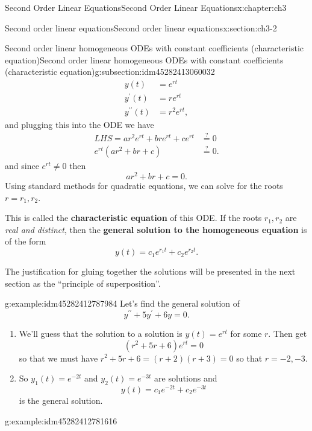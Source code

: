\documentclass[oneside,10pt,]{book}
\newcommand{\terminology}[1]{\textbf{#1}}
\numberwithin{equation}{section}
\numberwithin{equation}{section}
\newcommand{\amp}{&}
\begin{document}
\begin{chapterptx}{Second Order Linear Equations}{}{Second Order Linear Equations}{}{}{x:chapter:ch3}
\begin{sectionptx}{Second order linear equations}{}{Second order linear equations}{}{}{x:section:ch3-2}
\begin{subsectionptx}{Second order linear homogeneous ODEs with constant coefficients (characteristic equation)}{}{Second order linear homogeneous ODEs with constant coefficients (characteristic equation)}{}{}{g:subsection:idm45282413060032}
\begin{align*}
y(t) \amp =e^{rt}\\
y^{\prime}(t) \amp =re^{rt}\\
y^{\prime\prime}(t) \amp =r^{2}e^{rt},
\end{align*}
and plugging this into the ODE we have%
\begin{align*}
LHS=ar^{2}e^{rt}+bre^{rt}+ce^{rt} \amp \overset{?}{=}0\\
e^{rt}\left(ar^{2}+br+c\right) \amp \overset{?}{=}0.
\end{align*}
and since \(e^{rt}\neq0\) then%
\begin{equation*}
ar^{2}+br+c=0.
\end{equation*}
Using standard methods for quadratic equations, we can solve for the roots \(r=r_{1},r_{2}\).%
\par
This is called the \terminology{characteristic equation} of this ODE. If the roots \(r_1, r_2\) are \emph{real and distinct}, then the \terminology{general solution to the homogeneous equation} is of the form%
\begin{equation*}
y(t)=c_{1}e^{r_{1}t}+c_{2}e^{r_{2}t}.
\end{equation*}
%
\par
The justification for gluing together the solutions will be presented in the next section as the ``principle of superposition''.%
\begin{example}{}{g:example:idm45282412787984}%
Let's find the general solution of%
\begin{equation*}
y^{\prime\prime}+5y^{\prime}+6y=0.
\end{equation*}
%
%
\begin{enumerate}
\item{}We'll guess that the solution to a solution is \(y(t)=e^{rt}\) for some \(r\). Then get%
\begin{equation*}
\left(r^{2}+5r+6\right)e^{rt}=0
\end{equation*}
so that we must have \(r^{2}+5r+6=\left(r+2\right)\left(r+3\right)=0\) so that \(r=-2,-3\).%
\item{}So \(y_{1}(t)=e^{-2t}\) and \(y_{2}(t)=e^{-3t}\) are solutions and%
\begin{equation*}
y(t)=c_{1}e^{-2t}+c_{2}e^{-3t}
\end{equation*}
is the general solution.%
\end{enumerate}
\end{example}
\begin{example}{}{g:example:idm45282412781616}%

\end{example}
\end{subsectionptx}
\end{sectionptx}
\end{chapterptx}
\end{document}
